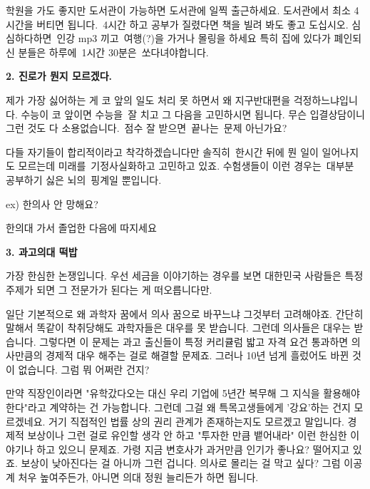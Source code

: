 학원을 가도 좋지만 도서관이 가능하면 도서관에 일찍 출근하세요.
도서관에서 최소 4시간을 버티면 됩니다. 4시간 하고 공부가 질렸다면 책을 빌려 봐도 좋고 도십시오.
심심하다하면 인강 mp3 끼고 여행(?)을 가거나 몰링을 하세요
특히 집에 있다가 폐인되신 분들은 하루에 1시간 30분은 쏘다녀야합니다.
\vspace{5mm}

\item \textbf{2. 진로가 뭔지 모르겠다.}
\vspace{5mm}

제가 가장 싫어하는 게 코 앞의 일도 처리 못 하면서 왜 지구반대편을 걱정하느냐입니다.
수능이 코 앞이면 수능을 잘 치고 그 다음을 고민하시면 됩니다.
무슨 입결상담이니 그런 것도 다 소용없습니다. 점수 잘 받으면 끝나는 문제 아닌가요?
\vspace{5mm}

다들 자기들이 합리적이라고 착각하겠습니다만 솔직히 한시간 뒤에 뭔 일이 일어나지도 모르는데 미래를 기정사실화하고 고민하고 있죠.
수험생들이 이런 경우는 대부분 공부하기 싫은 뇌의 핑계일 뿐입니다.
\vspace{5mm}

ex) 한의사 안 망해요?
\vspace{5mm}

한의대 가서 졸업한 다음에 따지세요
\vspace{5mm}

\item \textbf{3. 과고의대 떡밥}
\vspace{5mm}

가장 한심한 논쟁입니다.
우선 세금을 이야기하는 경우를 보면 대한민국 사람들은 특정 주제가 되면 그 전문가가 된다는 게 떠오릅니다만.
\vspace{5mm}

일단 기본적으로 왜 과학자 꿈에서 의사 꿈으로 바꾸느냐 그것부터 고려해야죠.
간단히 말해서 똑같이 착취당해도 과학자들은 대우를 못 받습니다. 그런데 의사들은 대우는 받습니다.
그렇다면 이 문제는 과고 출신들이 특정 커리큘럼 밟고 자격 요건 통과하면 의사만큼의 경제적 대우 해주는 걸로 해결할 문제죠.
그러나 10년 넘게 흘렀어도 바뀐 것이 없습니다. 그럼 뭐 어쩌란 건지?
\vspace{5mm}

만약 직장인이라면 "유학갔다오는 대신 우리 기업에 5년간 복무해 그 지식을 활용해야한다"라고 계약하는 건 가능합니다.
그런데 그걸 왜 특목고생들에게 '강요'하는 건지 모르겠네요. 거기 직접적인 법률 상의 권리 관계가 존재하는지도 모르겠고 말입니다.
경제적 보상이나 그런 걸로 유인할 생각 안 하고 "투자한 만큼 뱉어내라" 이런 한심한 이야기나 하고 있으니 문제죠.
가령 지금 변호사가 과거만큼 인기가 좋나요? 떨어지고 있죠. 보상이 낮아진다는 걸 아니까 그런 겁니다.
의사로 몰리는 걸 막고 싶다? 그럼 이공계 처우 높여주든가, 아니면 의대 정원 늘리든가 하면 됩니다.
\vspace{5mm}

